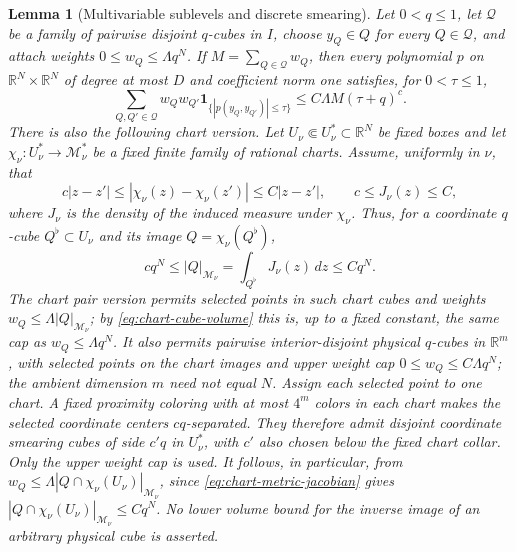 \documentclass[11pt]{article}
\numberwithin{equation}{section}
\newtheorem{lemma}[theorem]{Lemma}
\theoremstyle{remark}
\theoremstyle{definition}
\newcommand{\R}{\mathbb R}
\begin{document}
\begin{lemma}[Multivariable sublevels and discrete smearing]
Let $0<q\le1$, let $\mathcal Q$ be a family of pairwise disjoint
$q$-cubes in $I$, choose $y_Q\in Q$ for every $Q\in\mathcal Q$, and
attach weights $0\le w_Q\le\Lambda q^N$.  If
$M=\sum_{Q\in\mathcal Q}w_Q$, then every polynomial $p$ on
$\R^N\times\R^N$ of degree at most $D$ and coefficient norm one satisfies,
for $0<\tau\le1$,
\begin{equation}\label{eq:weighted-pair-sublevel}
 \sum_{Q,Q'\in\mathcal Q}w_Qw_{Q'}
 \mathbf1_{\{|p(y_Q,y_{Q'})|\le\tau\}}
 \le C\Lambda M(\tau+q)^c.
\end{equation}
There is also the following chart version.  Let
$U_\nu\Subset U_\nu^*\subset\R^N$ be fixed boxes and let
$\chi_\nu:U_\nu^*\to\mathcal M_\nu^*$ be a fixed finite family of rational
charts.  Assume, uniformly in $\nu$, that
\begin{equation}\label{eq:chart-metric-jacobian}
 c|z-z'|\le |\chi_\nu(z)-\chi_\nu(z')|\le C|z-z'|,
 \qquad c\le J_\nu(z)\le C,
\end{equation}
where $J_\nu$ is the density of the induced measure under $\chi_\nu$.
Thus, for a coordinate $q$-cube $Q^\flat\subset U_\nu$ and its image
$Q=\chi_\nu(Q^\flat)$,
\begin{equation}\label{eq:chart-cube-volume}
 c q^N\le |Q|_{\mathcal M_\nu}
 =\int_{Q^\flat}J_\nu(z)\,dz\le Cq^N.
\end{equation}
The chart pair version permits selected points in such chart cubes and
weights $w_Q\le\Lambda|Q|_{\mathcal M_\nu}$; by
\eqref{eq:chart-cube-volume} this is, up to a fixed constant, the same cap
as $w_Q\le\Lambda q^N$.  It also permits pairwise interior-disjoint
physical $q$-cubes in $\R^m$, with selected points on the chart images
and upper weight cap $0\le w_Q\le C\Lambda q^N$; the ambient dimension
$m$ need not equal $N$.  Assign each selected point to one chart.  A
fixed proximity coloring with at most $4^m$ colors in each chart makes
the selected coordinate centers $cq$-separated.  They therefore admit
disjoint coordinate smearing cubes of side $c'q$ in $U_\nu^*$, with
$c'$ also chosen below the fixed chart collar.  Only the upper weight
cap is used.  It follows, in particular, from
$w_Q\le\Lambda|Q\cap\chi_\nu(U_\nu)|_{\mathcal M_\nu}$, since
\eqref{eq:chart-metric-jacobian} gives
$|Q\cap\chi_\nu(U_\nu)|_{\mathcal M_\nu}\le Cq^N$.
No lower volume bound for the inverse image of an arbitrary physical
cube is asserted.


\end{lemma}
\end{document}
